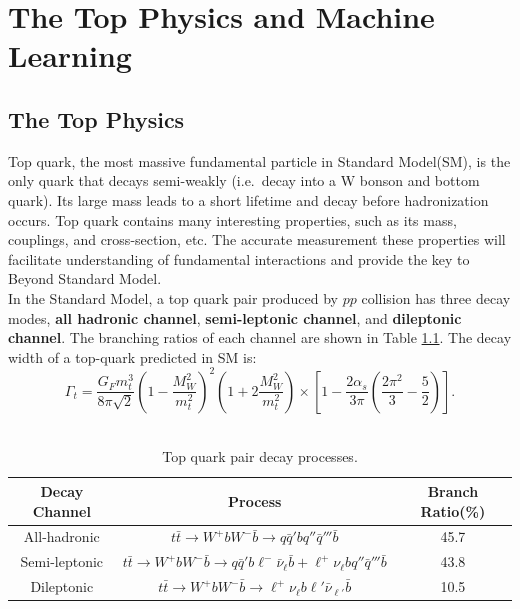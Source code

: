 
\chapter{The Top Physics and Machine Learning}

\section{The Top Physics}

Top quark, the most massive fundamental particle in Standard Model(SM), is the only quark that decays semi-weakly (i.e.~decay into a W bonson and bottom quark). Its large mass leads to a short lifetime and decay before hadronization occurs. Top quark contains many interesting properties, such as its mass, couplings, and cross-section, etc. The accurate measurement these properties will facilitate understanding of fundamental interactions and provide the key to Beyond Standard Model\cite{Zyla:2020zbs}.
\\
In the Standard Model, a top quark pair produced by $pp$ collision has three decay modes, \textbf{all hadronic channel}, \textbf{semi-leptonic channel}, and \textbf{dileptonic channel}. The branching ratios of each channel are shown in Table \ref{table:Branchratio}. The decay width of a top-quark predicted in SM is\cite{A.Quadt:2008TopPhysics}: 
\begin{equation}
	\Gamma_{t} = \frac{G_{F}m_{t}^{3}}{8\pi\sqrt{2}}\left(1-\frac{M_{W}^{2}}{m_{t}^{2}}\right)^{2}\left(1+2\frac{M_{W}^{2}}{m_{t}^{2}}\right)\times\left[1 - \frac{2\alpha_{s}}{3\pi}\left( \frac{2\pi^{2}}{3} - \frac{5}{2}\right) \right].
\end{equation}
\\
\begin{center}
\begin{table}[h]
\begin{tabular}{ c c c}
	\cline{1-3}
	Decay Channel    & Process & Branch Ratio(\%) \\
	\hline
	All-hadronic      & $t\bar{t}\to W^{+}bW^{-}\bar{b}\to q\bar{q}'bq''\bar{q}'''\bar{b}$    & 45.7     \\
	Semi-leptonic       &   $t\bar{t}\to W^{+}bW^{-}\bar{b}\to q\bar{q}'b\ell^{-}\bar{\nu}_{\ell}\bar{b} + \ell^{+}\nu_{\ell}bq''\bar{q}'''\bar{b}$   & 43.8     \\
	Dileptonic      &   $t\bar{t}\to W^{+}bW^{-}\bar{b}\to \ell^{+}\nu_{\ell}b\ell'\bar{\nu}_{\ell'}\bar{b}$   & 10.5      \\
	\hline
\end{tabular}
\caption{Top quark pair decay processes\cite{Zyla:2020zbs}.}
\label{table:Branchratio}
\end{table}
\end{center}

